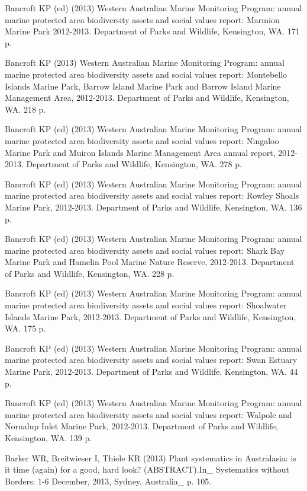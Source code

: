 \documentclass[version=last, paper=a4, DIV=18, usenames, dvipsnames]{scrartcl}
\begin{document}
Bancroft KP (ed) (2013) Western Australian Marine Monitoring Program: annual marine protected area biodiversity assets and social values report: Marmion Marine Park 2012-2013. Department of Parks and Wildlife, Kensington, WA. 171 p.


Bancroft KP (2013) Western Australian Marine Monitoring Program: annual marine protected area biodiversity assets and social values report: Montebello Islands Marine Park, Barrow Island Marine Park and Barrow Island Marine Management Area, 2012-2013. Department of Parks and Wildlife, Kensington, WA. 218 p.


Bancroft KP (ed) (2013) Western Australian Marine Monitoring Program: annual marine protected area biodiversity assets and social values report: Ningaloo Marine Park and Muiron Islands Marine Management Area annual report, 2012-2013. Department of Parks and Wildlife, Kensington, WA. 278 p.


Bancroft KP (ed) (2013) Western Australian Marine Monitoring Program: annual marine protected area biodiversity assets and social values report: Rowley Shoals Marine Park, 2012-2013. Department of Parks and Wildlife, Kensington, WA. 136 p.


Bancroft KP (ed) (2013) Western Australian Marine Monitoring Program: annual marine protected area biodiversity assets and social values report: Shark Bay Marine Park and Hamelin Pool Marine Nature Reserve, 2012-2013. Department of Parks and Wildlife, Kensington, WA. 228 p.


Bancroft KP (ed) (2013) Western Australian Marine Monitoring Program: annual marine protected area biodiversity assets and social values report: Shoalwater Islands Marine Park, 2012-2013. Department of Parks and Wildlife, Kensington, WA. 175 p.


Bancroft KP (ed) (2013) Western Australian Marine Monitoring Program: annual marine protected area biodiversity assets and social values report: Swan Estuary Marine Park, 2012-2013. Department of Parks and Wildlife, Kensington, WA. 44 p.


Bancroft KP (ed) (2013) Western Australian Marine Monitoring Program: annual marine protected area biodiversity assets and social values report: Walpole and Nornalup Inlet Marine Park, 2012-2013. Department of Parks and Wildlife, Kensington, WA. 139 p.


Barker WR, Breitwieser I, Thiele KR (2013) Plant systematics in Australasia: is it time (again) for a good, hard look? (ABSTRACT).In_ Systematics without Borders: 1-6 December, 2013, Sydney, Australia_ p. 105.
\end{document}
